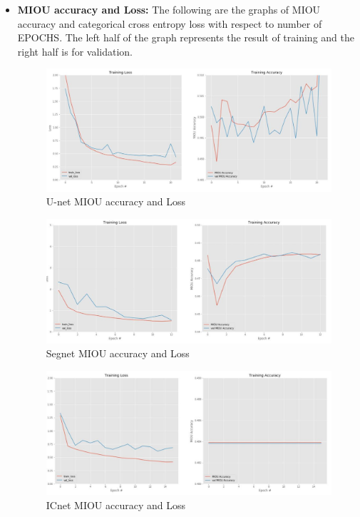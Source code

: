 \documentclass{article}
\begin{document}
\setcounter{page}{8}

\begin{itemize}
\item \textbf{MIOU accuracy and Loss:}
The following are the graphs of MIOU accuracy and categorical cross entropy loss with respect to number of EPOCHS. The left half of the graph represents the result of training and the right half is for validation.

\begin{figure}[h]
    \centering
    \captionsetup{justification=centering}
    \includegraphics[width=14cm]{U-net-cityscrapes-B16-gr.JPG}
    \caption{U-net MIOU accuracy and Loss}
    \label{fig:Binary class segmented output}
\end{figure}

\begin{figure}[h]
    \centering
    \captionsetup{justification=centering}
    \includegraphics[width=14cm]{Segnet-cityscrapes-B16-gr.JPG}
    \caption{Segnet MIOU accuracy and Loss}
    \label{fig:Binary class segmented output}
\end{figure}

\begin{figure}[h]
    \centering
    \captionsetup{justification=centering}
    \includegraphics[width=14cm]{ICnet-cityscrapes-B16-gr.JPG}
    \caption{ICnet MIOU accuracy and Loss}
    \label{fig:Binary class segmented output}
\end{figure}


\end{itemize}
\end{document}
